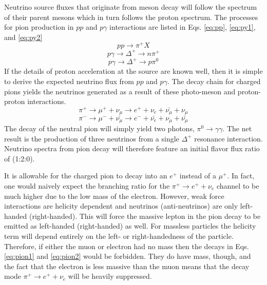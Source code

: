 \documentclass{gatech-thesis}
\begin{document}
Neutrino source fluxes that originate from meson decay will follow the spectrum of their parent mesons which in turn follows the proton spectrum. The processes for pion production in $pp$ and $p\gamma$ interactions are listed in Eqs. \ref{eq:pp}, \ref{eq:py1}, and \ref{eq:py2}
\begin{equation}\label{eq:pp}
pp \rightarrow \pi^+X
\end{equation}
\begin{equation}\label{eq:py1}
p\gamma \rightarrow \Delta^+ \rightarrow n \pi^+
\end{equation}
\begin{equation}\label{eq:py2}
p\gamma \rightarrow \Delta^+ \rightarrow p \pi^0
\end{equation}
If the details of proton acceleration at the source are known well, then it is simple to derive the expected neutrino flux from $pp$ and $p\gamma$. The decay chain for charged pions yields the neutrinos generated as a result of these photo-meson and proton-proton interactions.
\begin{equation}\label{eq:pion1}
\pi^+ \rightarrow \mu^+ + \nu_{\mu} \rightarrow e^+ + \nu_e + \bar{\nu_{\mu}} + \nu_{\mu}
\end{equation}
\begin{equation}\label{eq:pion2}
\pi^- \rightarrow \mu^- + \bar{\nu_{\mu}} \rightarrow e^- + \bar{\nu_e} + \nu_{\mu} + \bar{\nu_{\mu}} 
\end{equation}
The decay of the neutral pion will simply yield two photons, $\pi^0 \rightarrow \gamma\gamma$. The net result is the production of three neutrinos from a single $\Delta^+$ resonance interaction. Neutrino spectra from pion decay will therefore feature an initial flavor flux ratio of (1:2:0).

It is allowable for the charged pion to decay into an $e^+$ instead of a $\mu^+$. In fact, one would naively expect the branching ratio for the $\pi^+ \rightarrow e^+ + \nu_e$ channel to be much higher due to the low mass of the electron. However, weak force interactions are helicity dependent and neutrinos (anti-neutrinos) are only left-handed (right-handed). This will force the massive lepton in the pion decay to be emitted as left-handed (right-handed) as well. For massless particles the helicity term will depend entirely on the left- or right-handedness of the particle. Therefore, if either the muon or electron had no mass then the decays in Eqs. \ref{eq:pion1} and \ref{eq:pion2} would be forbidden. They do have mass, though, and the fact that the electron is less massive than the muon means that the decay mode $\pi^+ \rightarrow e^+ + \nu_e$ will be heavily suppressed.
\end{document}
